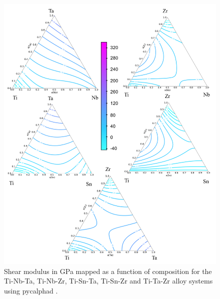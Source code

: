 \pagebreak
\begin{figure}[H]
	\centering
	\includegraphics[width=\textwidth]{Chapter-6/Figures/tixyshear2.png}
	\caption{Shear modulus in GPa mapped as a function of composition for the Ti-Nb-Ta, Ti-Nb-Zr, Ti-Sn-Ta, Ti-Sn-Zr and Ti-Ta-Zr alloy systems using pycalphad \cite{Otis2017}.}
	\label{Ch6-figure:tixyshear2}
\end{figure}

